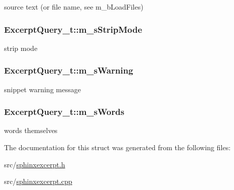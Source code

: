 source text (or file name, see m\-\_\-b\-Load\-Files) 

\hypertarget{structExcerptQuery__t_a7c99c5ca909e6092a9ccdd9409c38f46}{
\subsubsection[{m\-\_\-s\-Strip\-Mode}]{ Excerpt\-Query\-\_\-t\-::m\-\_\-s\-Strip\-Mode}}\label{structExcerptQuery__t_a7c99c5ca909e6092a9ccdd9409c38f46}


strip mode 

\hypertarget{structExcerptQuery__t_a32451a31255fd8c3f5633ff03e866c80}{
\subsubsection[{m\-\_\-s\-Warning}]{ Excerpt\-Query\-\_\-t\-::m\-\_\-s\-Warning}}\label{structExcerptQuery__t_a32451a31255fd8c3f5633ff03e866c80}


snippet warning message 

\hypertarget{structExcerptQuery__t_a11cdc32d46f830e774504ac77717d24f}{
\subsubsection[{m\-\_\-s\-Words}]{ Excerpt\-Query\-\_\-t\-::m\-\_\-s\-Words}}\label{structExcerptQuery__t_a11cdc32d46f830e774504ac77717d24f}


words themselves 



The documentation for this struct was generated from the following files\-:\begin{DoxyCompactItemize}
\item 
src/\hyperlink{sphinxexcerpt_8h}{sphinxexcerpt.\-h}\item 
src/\hyperlink{sphinxexcerpt_8cpp}{sphinxexcerpt.\-cpp}\end{DoxyCompactItemize}
